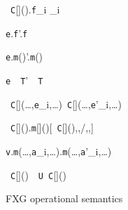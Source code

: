 \begin{figure*}
\vspace{-\bigskipamount}
\begin{minipage}{.4\textwidth}
\quad{}
	{\new~{\tt C}[]().{\tt f}_i _i}

	{{\tt e}.{\tt f}'.{\tt f}}

	{{\tt e}.{\tt m}()'.{\tt m}()}

	{{\tt e}~\as~{\tt T}'~\as~{\tt T}}
\end{minipage}%
\begin{minipage}{.6\textwidth}
\quad{}
	{\new~{\tt C}[](\ldots,{\tt e}_i,\ldots)\derives\new~{\tt C}[](\ldots,{\tt e}'_i,\ldots)}

	{\new~{\tt C}[]().{\tt m}[]()[\new~{\tt C}[](),,/\this,,]}

	{{\tt v}.{\tt m}(\ldots,{\tt a}_i,\ldots).{\tt m}(\ldots,{\tt a}'_i,\ldots)}

	{\new~{\tt C}[]()~\as~{\tt U}\derives\new~{\tt C}[]()}
\end{minipage}

\centering
\caption{{\sf FXG} operational semantics}
\label{fig:sos}
\end{figure*}


